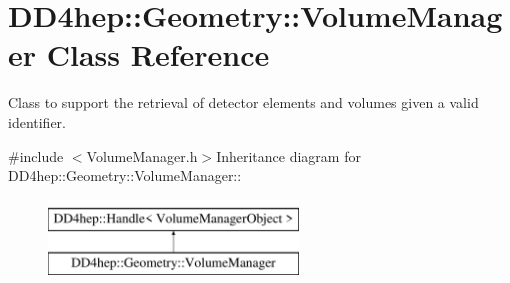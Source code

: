 \hypertarget{class_d_d4hep_1_1_geometry_1_1_volume_manager}{
\section{DD4hep::Geometry::VolumeManager Class Reference}
\label{class_d_d4hep_1_1_geometry_1_1_volume_manager}
}


Class to support the retrieval of detector elements and volumes given a valid identifier.  


{\ttfamily \#include $<$VolumeManager.h$>$}Inheritance diagram for DD4hep::Geometry::VolumeManager::\begin{figure}[H]
\begin{center}
\leavevmode
\includegraphics[height=2cm]{class_d_d4hep_1_1_geometry_1_1_volume_manager}
\end{center}
\end{figure}

